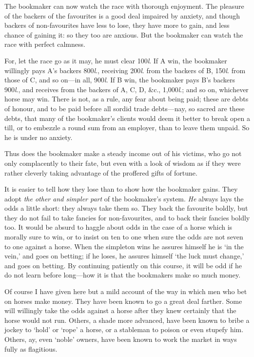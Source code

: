 \documentclass[letterpaper,12pt,oneside,openany]{memoir}
\begin{document}
The bookmaker can now watch the race with
thorough enjoyment. The pleasure of the backers of
the favourites is a good deal impaired by anxiety, and
though backers of non-favourites have less to lose, they
have more to gain, and less chance of gaining it: so
they too are anxious. But the bookmaker can watch
the race with perfect calmness.

For, let the race go as it may, he must clear 100\textit{l}.
If A win, the bookmaker willingly pays A's backers
800\textit{l}., receiving 200\textit{l}. from the backers of B, 150\textit{l}. from
those of C, and so on---in all, 900\textit{l}. If B win, the
bookmaker pays B's backers 900\textit{l}., and receives from the
backers of A, C, D, \&c., 1,000\textit{l}.; and so on, whichever
horse may win. There is not, as a rule, any fear about
being paid; these are debts of honour, and to be paid
before all sordid trade debts---nay, so sacred are these
debts, that many of the bookmaker's clients would deem
it better to break open a till, or to embezzle a round
sum from an employer, than to leave them unpaid. So
he is under no anxiety.

Thus does the bookmaker make a steady income out
of his victims, who go not only complacently to their
fate, but even with a look of wisdom as if they were
rather cleverly taking advantage of the proffered gifts
of fortune.

It is easier to tell how they lose than to show how
the bookmaker gains. They adopt \textit{the other and simpler
part} of the bookmaker's system. \emph{He} always lays the
odds a little short: they always take them so. They
back the favourite boldly, but they do not fail to take
fancies for non-favourites, and to back their fancies
boldly too. It would be absurd to haggle about odds
in the case of a horse which is morally sure to win, or
to insist on ten to one when sure the odds are not seven
to one against a horse. When the simpleton wins he
assures himself he is `in the vein,' and goes on betting;
if he loses, he assures himself `the luck must change,'
and goes on betting. By continuing patiently on this
course, it will be odd if he do not learn before long---how
it is that the bookmakers make so much money.

Of course I have given here but a mild account of
the way in which men who bet on horses make money.
They have been known to go a great deal farther. Some
will willingly take the odds against a horse after they
knew certainly that the horse would not run. Others,
a shade more advanced, have been known to bribe a
jockey to `hold' or `rope' a horse, or a stableman to
poison or even stupefy him. Others, ay, even `noble'
owners, have been known to work the market in ways
fully as flagitious.
\end{document}

